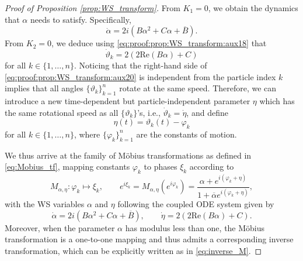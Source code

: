 \documentclass[10pt]{article}
\theoremstyle{definition}
\theoremstyle{definition}
\numberwithin{equation}{section}
\newcommand{\re}[1]{\mathrm{Re}\left(#1\right)}
\newcommand{\alphaBar}{\overline{\alpha}}
\newcommand{\Dalpha}{\Dot{\alpha}}
\newcommand{\Dvartheta}{\Dot{\vartheta}}
\newcommand{\Deta}{\Dot{\eta}}
\newcommand{\JPN}[1]{\marginpar{\scriptsize{JP: {#1}}}}
\begin{document}
\begin{proof}[Proof of Proposition \ref{prop:WS_transform}]
    From $K_1 = 0$, we obtain the dynamics that $\alpha$ needs to satisfy.
    Specifically,
    \begin{equation}
        \label{eq:proof:prop:WS_transform:aux18}
    \Dalpha = 2i \left( B \alpha^2 + C \alpha + \overline{B} \right) .
    \end{equation}
    From $K_2 = 0$, we deduce using \eqref{eq:proof:prop:WS_transform:aux18} that
    \begin{equation}
        \label{eq:proof:prop:WS_transform:aux20}
    \Dvartheta_k = 2 \left( 2\re{B \alpha} + C  \right)
    \end{equation}
    for all $k \in \{1,\dots,n\}$.
    Noticing that the right-hand side of \eqref{eq:proof:prop:WS_transform:aux20} is independent from the particle index $k$ implies that all angles $\{\vartheta_k\}_{k=1}^n$ rotate at the same speed.
    Therefore, we can introduce a new time-dependent but particle-independent parameter $\eta$ which has the same rotational speed as all $\{\vartheta_k\}$'s, i.e., $\Dvartheta_k=\Deta$, and define
    \begin{equation*}
        \eta(t) = \vartheta_k (t) - \varphi_k
    \end{equation*}
    for all $k \in \{1,\dots,n\}$,
    where $\{\varphi_k\}_{k=1}^n$ are the constants of motion.
    
    We thus arrive at the family of Möbius transformations as defined in \eqref{eq:Mobius_tf}, mapping constants $\varphi_k$ to phases $\xi_k$ according to
    \begin{equation*}
    M_{\alpha, \eta}: \varphi_k \mapsto \xi_k, \qquad e^{i\xi_k} = M_{\alpha,\eta} (e^{i\varphi_k}) = \frac{\alpha + e^{i(\varphi_k +\eta)}}{ 1 + \alphaBar e^{i(\varphi_k +\eta)}},
    \end{equation*}
    with the WS variables $\alpha$ and $\eta$ following the coupled ODE system given by
    \begin{equation*}
    \dot{\alpha} = 2 i \left( B \alpha^2 + C  \alpha + \overline{B} \right), \qquad
    \dot{\eta} = 2 \left(2 \re{B \alpha} + C \right) .
    \end{equation*}
    Moreover, when the parameter $\alpha$ has modulus less than one, the Möbius transformation is a one-to-one mapping and thus admits a corresponding inverse transformation, which can be explicitly written as in \eqref{eq:inverse_M}.
\end{proof}

\end{document}
